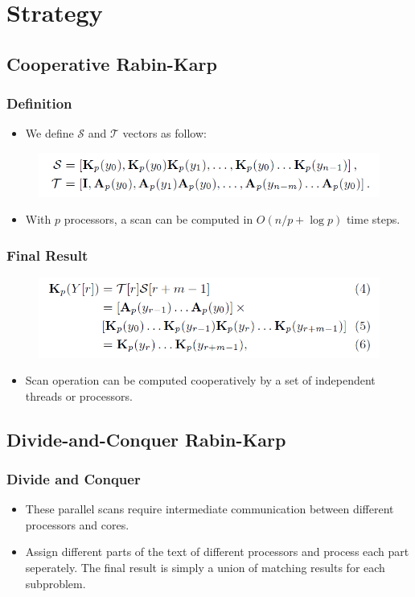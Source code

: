 \section{Strategy}

\subsection{Cooperative Rabin-Karp}
\begin{frame}
	\frametitle{Definition}
	\begin{itemize}
		\item We define $\mathcal{S}$ and $\mathcal{T}$ vectors 
		as follow:
	\end{itemize}
	\begin{figure}
		\includegraphics[scale=0.50]{figure/fig-ST.png}
	\end{figure}
	\begin{itemize}
		\item With $p$ processors, a scan can be computed in 
			$O(n/p + \log p)$ time steps.
	\end{itemize}
\end{frame}


\begin{frame}
	\frametitle{Final Result}
	\begin{figure}
		\includegraphics[scale=0.50]{figure/fig-Kp.png}
	\end{figure}
	\begin{itemize}
		\item Scan operation can be computed cooperatively by a set of 
		independent threads or processors.
	\end{itemize}
\end{frame}

\subsection{Divide-and-Conquer Rabin-Karp}
\begin{frame}
	\frametitle{Divide and Conquer}
	\begin{itemize}
		\setlength\itemsep{1em}
		\item These parallel scans require intermediate communication
		 between different processors and cores.
		\item Assign different parts of the text of different 
		processors and process each part seperately. The final result
		is simply a union of matching results for each subproblem.
	\end{itemize}
\end{frame}

